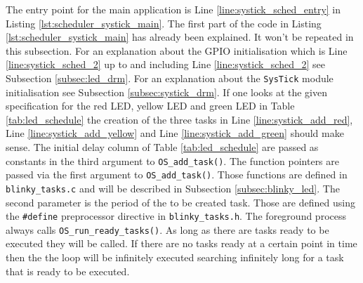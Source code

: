 \newpage

The entry point for the main application is Line \ref{line:systick_sched_entry} in Listing \ref{lst:scheduler_systick_main}.
The first part of the code in Listing \ref{lst:scheduler_systick_main} has already been explained. It won't be repeated in this subsection.
For an explanation about the GPIO initialisation which is Line \ref{line:systick_sched_2} up to and including Line \ref{line:systick_sched_2} see Subsection \ref{subsec:led_drm}.
For an explanation about the \texttt{SysTick} module initialisation see Subsection \ref{subsec:systick_drm}.
If one looks at the given specification for the red LED, yellow LED and green LED in Table \ref{tab:led_schedule} the creation of the three tasks in Line \ref{line:systick_add_red}, Line \ref{line:systick_add_yellow} and Line \ref{line:systick_add_green} should make sense.
The initial delay column of Table \ref{tab:led_schedule} are passed as constants in the third argument to \texttt{OS\_add\_task()}.
The function pointers are passed via the first argument to \texttt{OS\_add\_task()}. Those functions are defined in \texttt{blinky\_tasks.c} and will be described in Subsection \ref{subsec:blinky_led}.
The second parameter is the period of the to be created task.
Those are defined using the \texttt{\#define} preprocessor directive in \texttt{blinky\_tasks.h}.
The foreground process always calls \texttt{OS\_run\_ready\_tasks()}. As long as there are tasks ready to be executed they will be called.
If there are no tasks ready at a certain point in time then the the loop will be infinitely executed searching infinitely long for a task that is ready to be executed.

